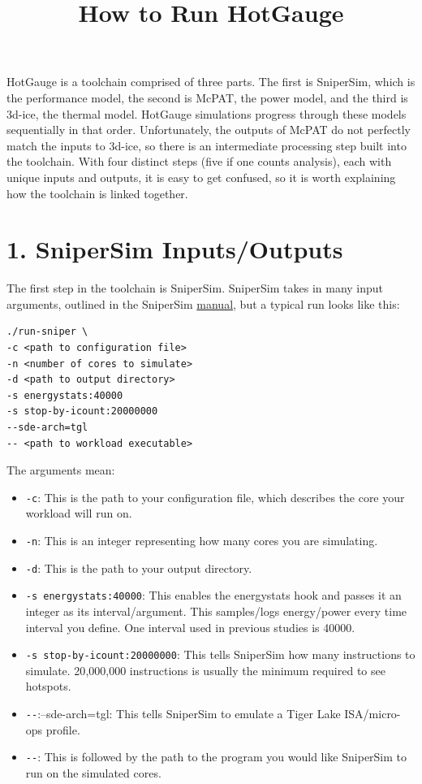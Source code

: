 \documentclass[11pt]{article}
\title{How to Run HotGauge}
\author{}
\date{}
\begin{document}
\maketitle

HotGauge is a toolchain comprised of three parts. The first is SniperSim, which is the
performance model, the second is McPAT, the power model, and the third is 3d-ice, the thermal
model. HotGauge simulations progress through these models sequentially in that order.
Unfortunately, the outputs of McPAT do not perfectly match the inputs to 3d-ice, so there is an
intermediate processing step built into the toolchain. With four distinct steps (five if one counts
analysis), each with unique inputs and outputs, it is easy to get confused, so it is worth
explaining how the toolchain is linked together.

\section*{1. SniperSim Inputs/Outputs}

The first step in the toolchain is SniperSim. SniperSim takes in many input arguments, outlined in
the SniperSim \href{https://snipersim.org/documents/sniper-manual.pdf}{manual}, but a typical run looks like this:

\begin{lstlisting}
./run-sniper \
-c <path to configuration file>
-n <number of cores to simulate>
-d <path to output directory>
-s energystats:40000
-s stop-by-icount:20000000
--sde-arch=tgl
-- <path to workload executable>
\end{lstlisting}

The arguments mean:

\begin{itemize}[leftmargin=2em]
    \item \texttt{-c}: This is the path to your configuration file, which describes the core your workload will run on.
    \item \texttt{-n}: This is an integer representing how many cores you are simulating.
    \item \texttt{-d}: This is the path to your output directory.
    \item \texttt{-s energystats:40000}: This enables the energystats hook and passes it an integer as its interval/argument. This samples/logs energy/power every time interval you define. One interval used in previous studies is 40000.
    \item \texttt{-s stop-by-icount:20000000}: This tells SniperSim how many instructions to simulate. 20{,}000{,}000 instructions is usually the minimum required to see hotspots.
    \item \verb|--|:{--sde-arch=tgl}: This tells SniperSim to emulate a Tiger Lake ISA/micro-ops profile.
    \item \verb|--|: This is followed by the path to the program you would like SniperSim to run on the simulated cores.
\end{itemize}
\end{document}
